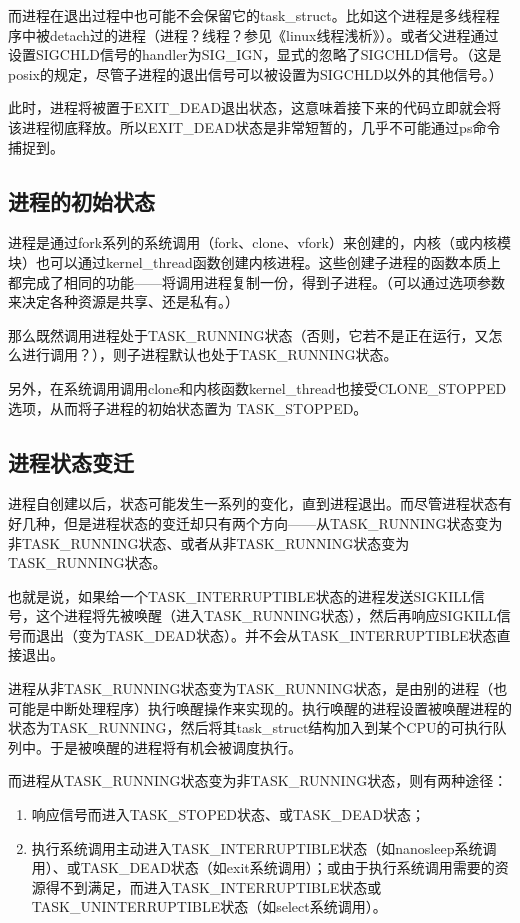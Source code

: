 \documentclass[doctor,openright,twoside]{sjtuthesis}
\providecommand{\tightlist}{%
    \setlength{\itemsep}{0pt}\setlength{\parskip}{0pt}}
\theoremstyle{plain}
\theoremstyle{definition}
\theoremstyle{remark}
\theoremstyle{ocrenumbox}
\theoremstyle{plain}
\begin{document}
而进程在退出过程中也可能不会保留它的task\_struct。比如这个进程是多线程程序中被detach过的进程（进程？线程？参见《linux线程浅析》）。或者父进程通过设置SIGCHLD信号的handler为SIG\_IGN，显式的忽略了SIGCHLD信号。（这是posix的规定，尽管子进程的退出信号可以被设置为SIGCHLD以外的其他信号。）

此时，进程将被置于EXIT\_DEAD退出状态，这意味着接下来的代码立即就会将该进程彻底释放。所以EXIT\_DEAD状态是非常短暂的，几乎不可能通过ps命令捕捉到。

\hypertarget{section-99}{%
\subsection{进程的初始状态}\label{section-99}}

进程是通过fork系列的系统调用（fork、clone、vfork）来创建的，内核（或内核模块）也可以通过kernel\_thread函数创建内核进程。这些创建子进程的函数本质上都完成了相同的功能------将调用进程复制一份，得到子进程。（可以通过选项参数来决定各种资源是共享、还是私有。）

那么既然调用进程处于TASK\_RUNNING状态（否则，它若不是正在运行，又怎么进行调用？），则子进程默认也处于TASK\_RUNNING状态。

另外，在系统调用调用clone和内核函数kernel\_thread也接受CLONE\_STOPPED选项，从而将子进程的初始状态置为 TASK\_STOPPED。

\hypertarget{section-100}{%
\subsection{进程状态变迁}\label{section-100}}

进程自创建以后，状态可能发生一系列的变化，直到进程退出。而尽管进程状态有好几种，但是进程状态的变迁却只有两个方向------从TASK\_RUNNING状态变为非TASK\_RUNNING状态、或者从非TASK\_RUNNING状态变为TASK\_RUNNING状态。

也就是说，如果给一个TASK\_INTERRUPTIBLE状态的进程发送SIGKILL信号，这个进程将先被唤醒（进入TASK\_RUNNING状态），然后再响应SIGKILL信号而退出（变为TASK\_DEAD状态）。并不会从TASK\_INTERRUPTIBLE状态直接退出。

进程从非TASK\_RUNNING状态变为TASK\_RUNNING状态，是由别的进程（也可能是中断处理程序）执行唤醒操作来实现的。执行唤醒的进程设置被唤醒进程的状态为TASK\_RUNNING，然后将其task\_struct结构加入到某个CPU的可执行队列中。于是被唤醒的进程将有机会被调度执行。

而进程从TASK\_RUNNING状态变为非TASK\_RUNNING状态，则有两种途径：

\begin{enumerate}
\def\labelenumi{\arabic{enumi}.}
\tightlist
\item
  响应信号而进入TASK\_STOPED状态、或TASK\_DEAD状态；
\item
  执行系统调用主动进入TASK\_INTERRUPTIBLE状态（如nanosleep系统调用）、或TASK\_DEAD状态（如exit系统调用）；或由于执行系统调用需要的资源得不到满足，而进入TASK\_INTERRUPTIBLE状态或TASK\_UNINTERRUPTIBLE状态（如select系统调用）。
\end{enumerate}
\end{document}

